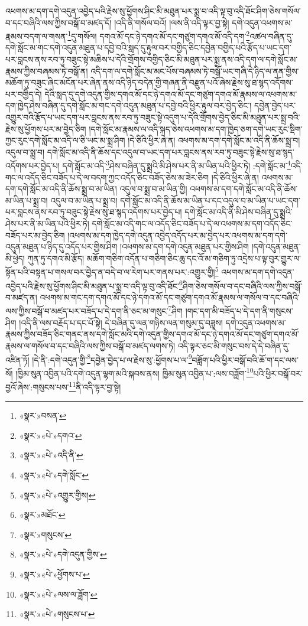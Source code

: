 འཕགས་མ་དག་དགེ་འདུན་འབྱེད་པའི་རྗེས་སུ་ཕྱོགས་ཤིང་མི་མཐུན་པར་སྨྲ་བ་འདི་ལྟ་བུ་འདི་ཐོང་ཤིག་ཅེས་གསོལ་བ་དང་བཞིའི་ལས་ཀྱིས་བསྒོ་བ་མཛད་དོ། །འདི་ནི་གསོལ་བའོ། །ལས་ནི་འདི་ལྟར་བྱ་སྟེ། དགེ་འདུན་འཕགས་མ་རྣམས་བདག་ལ་གསན་\footnote{«སྣར་»བསན་}དུ་གསོལ། དགའ་མོ་དང་ཉེ་དགའ་མོ་དང་གཙུག་དགའ་མོ་འདི་དག་\footnote{«སྣར་»«པེ་»དགའ་}འཚལ་བཞིན་དུ་དགེ་སློང་མ་གང་དགེ་འདུན་མཐུན་པ་དབྱེ་བའི་སླད་དུ་རྟུལ་བར་བགྱིད་ཅིང་དབྱེན་བགྱིད་པའི་རྩོད་པ་ཡང་དག་པར་བླངས་ནས་རབ་ཏུ་བཟུང་སྟེ་མཆིས་པ་དེའི་གྲོགས་བགྱིད་ཅིང་མི་མཐུན་པར་སྨྲ་ནས་འདི་དག་ལ་དགེ་སློང་མ་རྣམས་ཀྱིས་བཞམས་ཏེ་བསྒོ་ན། འདི་དག་ལ་དགེ་སློང་མ་མང་པོས་བཞམས་ཏེ་བསྒོ་ཡང་གཞི་དེ་ཉིད་ལ་ནན་གྱིས་མཆོག་ཏུ་བཟུང་ཞིང་མངོན་པར་ཞེན་ནས་འདི་ཉིད་བདེན་གྱི་གཞན་ནི་བརྫུན་པའོ་ཞེས་རྗེས་སུ་ཐ་སྙད་འདོགས་པར་བགྱིད་དེ། དེའི་སླད་དུ་དགེ་འདུན་གྱིས་དགའ་མོ་དང་ཉེ་དགའ་མོ་དང་གཙུག་དགའ་མོ་རྣམས་ལ་འཕགས་མ་དག་ཁྱེད་ཤེས་བཞིན་དུ་དགེ་སློང་མ་གང་དགེ་འདུན་མཐུན་པ་དབྱེ་བའི་ཕྱིར་རྟུལ་བར་བྱེད་ཅིང་། དབྱེན་བྱེད་པར་འགྱུར་བའི་རྩོད་པ་ཡང་དག་པར་བླངས་ནས་རབ་ཏུ་བཟུང་སྟེ་འདུག་པ་དེའི་གྲོགས་བྱེད་ཅིང་མི་མཐུན་པར་སྨྲ་བའི་རྗེས་སུ་ཕྱོགས་པར་མ་བྱེད་ཅིག །དགེ་སློང་མ་རྣམས་ལ་འདི་སྐད་ཅེས་འཕགས་མ་དག་ཁྱེད་ཅག་དགེ་ཡང་རུང་སྡིག་ཀྱང་རུང་དགེ་སློང་མ་འདི་ལ་ཅི་ཡང་མ་སྨྲ་ཤིག །དེ་ཅིའི་ཕྱིར་ཞེ་ན། འཕགས་མ་དག་དགེ་སློང་མ་འདི་ནི་ཆོས་སྨྲ་བ། འདུལ་བ་སྨྲ་བ། དགེ་སློང་མ་འདི་ནི་ཆོས་དང་འདུལ་བ་ཡང་དག་པར་བླངས་ནས་རབ་ཏུ་བཟུང་སྟེ་རྗེས་སུ་ཐ་སྙད་འདོགས་པར་བྱེད་པ། དགེ་སློང་མ་འདི་\footnote{«སྣར་»«པེ་»འདི་ནི་}ཤེས་བཞིན་དུ་སྨྲའི་མི་ཤེས་པར་ནི་མ་ཡིན་པའི་ཕྱིར་ཏེ། :དགེ་སློང་མ་\footnote{«སྣར་»«པེ་»དགེ་སློང་}འདི་གང་ལ་འདོད་ཅིང་བཟོད་པ་དེ་ལ་བདག་ཀྱང་འདོད་ཅིང་བཟོད་ཅེས་མ་ཟེར་ཅིག །དེ་ཅིའི་ཕྱིར་ཞེ་ན། འཕགས་མ་དག་དགེ་སློང་མ་འདི་ནི་ཆོས་སྨྲ་བ་མ་ཡིན། འདུལ་བ་སྨྲ་བ་མ་ཡིན་གྱི། འཕགས་མ་དག་དགེ་སློང་མ་འདི་ནི་ཆོས་མ་ཡིན་པ་སྨྲ་བ། འདུལ་བ་མ་ཡིན་པ་སྨྲ་བ། དགེ་སློང་མ་འདི་ནི་ཆོས་མ་ཡིན་པ་དང་འདུལ་བ་མ་ཡིན་པ་ཡང་དག་པར་བླངས་ནས་རབ་ཏུ་བཟུང་སྟེ་རྗེས་སུ་ཐ་སྙད་འདོགས་པར་བྱེད་པ། དགེ་སློང་མ་འདི་ནི་མི་ཤེས་བཞིན་དུ་སྨྲའི་ཤེས་པར་ནི་མ་ཡིན་པའི་ཕྱིར་ཏེ། དགེ་སློང་མ་འདི་གང་ལ་འདོད་ཅིང་བཟོད་པ་དེ་ལ་འཕགས་མ་དག་འདོད་ཅིང་བཟོད་པར་མ་བྱེད་ཅིག །འཕགས་མ་དག་ཁྱེད་དགེ་འདུན་འབྱེད་འདོད་པར་མ་བྱེད་པར་འཕགས་མ་དག་དགེ་འདུན་མཐུན་པ་ཉིད་དུ་འདོད་པར་གྱིས་ཤིག །འཕགས་མ་དག་དགེ་འདུན་མཐུན་པར་གྱིས་ཤིག །དགེ་འདུན་མཐུན་མི་ཕྱེད། ཀུན་ཏུ་དགའ་མི་རྩོད། མཆོག་གཅིག་འདོན་པ་གཅིག་ཅིང་ཆུ་དང་འོ་མ་གཅིག་ཏུ་འདྲེས་པ་ལྟ་བུར་གྱུར་ལ་སྟོན་པའི་བསྟན་པ་གསལ་བར་བྱེད་ན་བདེ་བ་ལ་རེག་པར་གནས་པར་:འགྱུར་གྱི།\footnote{«སྣར་»«པེ་»འགྱུར་གྱིས།} འཕགས་མ་དག་དགེ་འདུན་འབྱེད་པའི་རྗེས་སུ་ཕྱོགས་ཤིང་མི་མཐུན་པ་སྨྲ་བ་འདི་ལྟ་བུ་འདི་ཐོང་\footnote{«སྣར་»མཐོང་}ཤིག་ཅེས་གསོལ་བ་དང་བཞིའི་ལས་ཀྱིས་བསྒོ་བ་མཛད་ན། འཕགས་མ་གང་དག་དགའ་མོ་དང་ཉེ་དགའ་མོ་དང་གཙུག་དགའ་མོ་རྣམས་ལ་གསོལ་བ་དང་བཞིའི་ལས་ཀྱིས་བསྒོ་བ་མཛད་པར་བཟོད་པ་དེ་དག་ནི་ཅང་མ་གསུང་\footnote{«སྣར་»གསུངས་}ཤིག །གང་དག་མི་བཟོད་པ་དེ་དག་ནི་གསུངས་ཤིག །འདི་ནི་ལས་བརྗོད་པ་དང་པོ་སྟེ། དེ་བཞིན་དུ་ལན་གཉིས་ལན་གསུམ་དུ་བཟླས། དགེ་འདུན་འཕགས་མ་རྣམས་ཀྱིས་བཟོད་ཅིང་གནང་ནས་དགེ་སློང་མའི་དགེ་འདུན་གྱིས་དགའ་མོ་དང་ཉེ་དགའ་མོ་དང་གཙུག་དགའ་མོ་རྣམས་ལ་གསོལ་བ་དང་བཞིའི་ལས་ཀྱིས་བསྒོ་བ་མཛད་ལགས་ཏེ། འདི་ལྟར་ཅང་མི་གསུང་བས་དེ་དེ་བཞིན་དུ་འཛིན་ཏོ། །དེ་ནི་:དགེ་འདུན་གྱི་\footnote{«སྣར་»«པེ་»དགེ་འདུན་གྱིས་}དབྱེན་བྱེད་པ་ལ་རྗེས་སུ་:ཕྱོགས་པ་ལ་\footnote{«སྣར་»«པེ་»ཕྱོགས་པ་}བཟློག་པའི་ཕྱིར་བསྒོ་བའི་ཆོ་ག་དང་ལས་སོ། །ཁྱིམ་སུན་འབྱིན་པའི་དགེ་འདུན་ལྷག་མའི་སྐབས་ནས། ཁྱིམ་སུན་འབྱིན་པ་:ལས་བཟློག་\footnote{«སྣར་»«པེ་»ལས་ལ་ཟློག་}པའི་ཕྱིར་བསྒོ་བར་བྱའོ་ཞེས་:གསུངས་པས་\footnote{«སྣར་»«པེ་»གསུངས་པ་}ནི་འདི་ལྟར་བྱ་སྟེ། 
